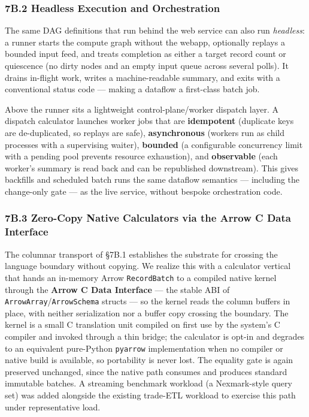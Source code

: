 \documentclass[
]{article}
\begin{document}
\hypertarget{b.2-headless-execution-and-orchestration}{%
\subsubsection{7B.2 Headless Execution and
Orchestration}\label{b.2-headless-execution-and-orchestration}}

The same DAG definitions that run behind the web service can also run
\emph{headless}: a runner starts the compute graph without the webapp,
optionally replays a bounded input feed, and treats completion as either
a target record count or quiescence (no dirty nodes and an empty input
queue across several polls). It drains in-flight work, writes a
machine-readable summary, and exits with a conventional status code ---
making a dataflow a first-class batch job.

Above the runner sits a lightweight control-plane/worker dispatch layer.
A dispatch calculator launches worker jobs that are \textbf{idempotent}
(duplicate keys are de-duplicated, so replays are safe),
\textbf{asynchronous} (workers run as child processes with a supervising
waiter), \textbf{bounded} (a configurable concurrency limit with a
pending pool prevents resource exhaustion), and \textbf{observable}
(each worker's summary is read back and can be republished downstream).
This gives backfills and scheduled batch runs the same dataflow
semantics --- including the change-only gate --- as the live service,
without bespoke orchestration code.

\hypertarget{b.3-zero-copy-native-calculators-via-the-arrow-c-data-interface}{%
\subsubsection{7B.3 Zero-Copy Native Calculators via the Arrow C Data
Interface}\label{b.3-zero-copy-native-calculators-via-the-arrow-c-data-interface}}

The columnar transport of §7B.1 establishes the substrate for crossing
the language boundary without copying. We realize this with a calculator
vertical that hands an in-memory Arrow \texttt{RecordBatch} to a
compiled native kernel through the \textbf{Arrow C Data Interface} ---
the stable ABI of \texttt{ArrowArray}/\texttt{ArrowSchema} structs ---
so the kernel reads the column buffers in place, with neither
serialization nor a buffer copy crossing the boundary. The kernel is a
small C translation unit compiled on first use by the system's C
compiler and invoked through a thin bridge; the calculator is opt-in and
degrades to an equivalent pure-Python \texttt{pyarrow} implementation
when no compiler or native build is available, so portability is never
lost. The equality gate is again preserved unchanged, since the native
path consumes and produces standard immutable batches. A streaming
benchmark workload (a Nexmark-style query set) was added alongside the
existing trade-ETL workload to exercise this path under representative
load.
\end{document}
